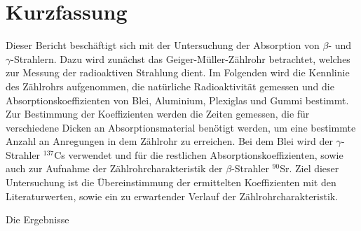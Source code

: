 \section{Kurzfassung}

Dieser Bericht beschäftigt sich mit der Untersuchung der Absorption von $\beta$- und $\gamma$-Strahlern.
Dazu wird zunächst das Geiger-Müller-Zählrohr betrachtet, welches zur Messung der radioaktiven Strahlung dient.
Im Folgenden wird die Kennlinie des Zählrohrs aufgenommen, die natürliche Radioaktivität gemessen und die Absorptionskoeffizienten von Blei, Aluminium, Plexiglas und Gummi bestimmt.
Zur Bestimmung der Koeffizienten werden die Zeiten gemessen, die für verschiedene Dicken an Absorptionsmaterial benötigt werden, um eine bestimmte Anzahl an Anregungen in dem Zählrohr zu erreichen.
Bei dem Blei wird der $\gamma$-Strahler $^{137}$Cs verwendet und für die restlichen Absorptionskoeffizienten, sowie auch zur Aufnahme der Zählrohrcharakteristik der $\beta$-Strahler $^{90}$Sr.
Ziel dieser Untersuchung ist die Übereinstimmung der ermittelten Koeffizienten mit den Literaturwerten, sowie ein zu erwartender Verlauf der Zählrohrcharakteristik.

Die Ergebnisse %
